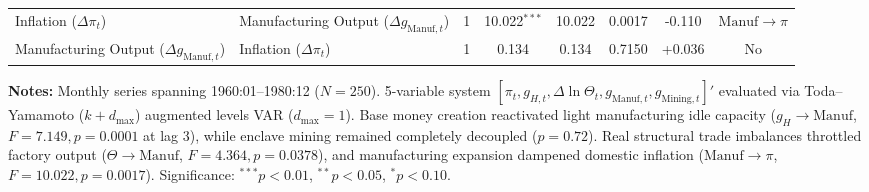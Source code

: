 \begin{table}[htbp]
{\begin{tabular}{llcccccc}
Inflation ($\Delta \pi_t$) & Manufacturing Output ($\Delta g_{\text{Manuf},t}$) & 1 & 10.022$^{***}$ & 10.022 & 0.0017 & -0.110 & $\text{Manuf} \to \pi$ \\
Manufacturing Output ($\Delta g_{\text{Manuf},t}$) & Inflation ($\Delta \pi_t$) & 1 & 0.134 & 0.134 & 0.7150 & +0.036 & No \\
\bottomrule
\end{tabular}%
}
\begin{minipage}{0.96\textwidth}
\vspace{0.3em}
\footnotesize \textbf{Notes:} Monthly series spanning 1960:01--1980:12 ($N=250$). 5-variable system $[\pi_t, g_{H,t}, \Delta \ln \Theta_t, g_{\text{Manuf},t}, g_{\text{Mining},t}]'$ evaluated via Toda--Yamamoto ($k+d_{\max}$) augmented levels VAR ($d_{\max}=1$). Base money creation reactivated light manufacturing idle capacity ($g_H \to \text{Manuf}$, $F = 7.149, p = 0.0001$ at lag 3), while enclave mining remained completely decoupled ($p = 0.72$). Real structural trade imbalances throttled factory output ($\Theta \to \text{Manuf}$, $F = 4.364, p = 0.0378$), and manufacturing expansion dampened domestic inflation ($\text{Manuf} \to \pi$, $F = 10.022, p = 0.0017$). Significance: $^{***} p < 0.01$, $^{**} p < 0.05$, $^{*} p < 0.10$.
\end{minipage}
\end{table}
